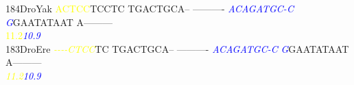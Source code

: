 \documentclass[11pt,twoside,reqno,a4paper]{article}
\begin{document}
{184\hspace*{1\charwidth}DroYak	\textcolor{Yellow}{A}\textcolor{Yellow}{C}\textcolor{Yellow}{T}\textcolor{Yellow}{C}\textcolor{Yellow}{C}TCCTC	TGACTGCA--	----------	\textit{\textcolor{Blue}{A}}\textit{\textcolor{Blue}{C}}\textit{\textcolor{Blue}{A}}\textit{\textcolor{Blue}{G}}\textit{\textcolor{Blue}{A}}\textit{\textcolor{Blue}{T}}\textit{\textcolor{Blue}{G}}\textit{\textcolor{Blue}{C}}\textit{\textcolor{Blue}{-}}\textit{\textcolor{Blue}{C}}	\textit{\textcolor{Blue}{G}}GAATATAAT	A---------	\\
\hspace*{4\charwidth}\hspace*{7\charwidth}\hspace*{0\charwidth}\textcolor{Yellow}{11.2}\hspace*{1\charwidth}\hspace*{1\charwidth}\hspace*{1\charwidth}\hspace*{26\charwidth}\textit{\textcolor{Blue}{10.9}}\hspace*{1\charwidth}\hspace*{1\charwidth}\hspace*{1\charwidth}\\
183\hspace*{1\charwidth}DroEre	\textit{\textcolor{Yellow}{-}}\textit{\textcolor{Yellow}{-}}\textit{\textcolor{Yellow}{-}}\textit{\textcolor{Yellow}{-}}\textit{\textcolor{Yellow}{C}}\textit{\textcolor{Yellow}{T}}\textit{\textcolor{Yellow}{C}}\textit{\textcolor{Yellow}{C}}TC	TGACTGCA--	----------	\textit{\textcolor{Blue}{A}}\textit{\textcolor{Blue}{C}}\textit{\textcolor{Blue}{A}}\textit{\textcolor{Blue}{G}}\textit{\textcolor{Blue}{A}}\textit{\textcolor{Blue}{T}}\textit{\textcolor{Blue}{G}}\textit{\textcolor{Blue}{C}}\textit{\textcolor{Blue}{-}}\textit{\textcolor{Blue}{C}}	\textit{\textcolor{Blue}{G}}GAATATAAT	A---------	\\
\hspace*{4\charwidth}\hspace*{7\charwidth}\hspace*{0\charwidth}\textit{\textcolor{Yellow}{11.2}}\hspace*{1\charwidth}\hspace*{1\charwidth}\hspace*{1\charwidth}\hspace*{26\charwidth}\textit{\textcolor{Blue}{10.9}}\hspace*{1\charwidth}\hspace*{1\charwidth}\hspace*{1\charwidth}\\
}
\end{document}
